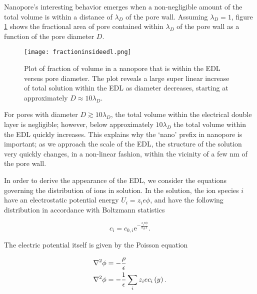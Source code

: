 			
			Nanopore's interesting behavior emerges when a non-negligible amount of the total volume is within a distance of $\lambda_{D}$ of the pore wall. Assuming $\lambda_{D}=1$, figure \ref{fig:fractioninsideedl} shows the fractional area of pore contained within $\lambda_{D}$ of the pore wall as a function of the pore diameter $D$. 
			
			\begin{figure} \label{fig:fractioninsideedl}
				\texttt{[image: fractioninsideedl.png]}
				\caption{Plot of fraction of volume in a nanopore that is within the EDL versus pore diameter. The plot reveals a large super linear increase of total solution within the EDL as diameter decreases, starting at approximately $D\approx 10\lambda_{D}$.}
			\end{figure}
			
			For pores with diameter $D\gtrsim10\lambda_{D}$, the total volume within the electrical double layer is negligible; however, below approximately $10\lambda_{D}$ the total volume within the EDL quickly increases. This explains why the `nano' prefix in nanopore is important; as we approach the scale of the EDL, the structure of the solution very quickly changes, in a non-linear fashion, within the vicinity of a few nm of the pore wall.
			
			
			
			In order to derive the appearance of the EDL, we consider the equations governing the distribution of ions in solution. In the solution, the ion species $i$ have an electrostatic potential energy $U_{i}=z_{i}e\phi$, and have the following distribution in accordance with Boltzmann statistics
			
			
			
			\begin{equation} \label{eq:boltzmann}
				c_{i}=c_{0,i}\mathrm{e}^{-\frac{z_{i}e\phi}{k_{B}T}}.
			\end{equation}
			
			The electric potential itself is given by the Poisson equation
			
			\begin{equation} \label{eq:poisson}
				\begin{split}
					\mathbf{\nabla}^{2}\phi & = -\frac{\rho}{\epsilon} \\
					\mathbf{\nabla}^{2}\phi & = -\frac{1}{\epsilon}\sum_{i}z_{i}ec_{i}\left(y\right).
				\end{split}
			\end{equation}
			
